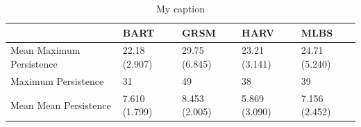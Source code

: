 \documentclass[10pt]{article}
\begin{document}
\begin{table}[]
\centering
\caption{My caption}
\label{Table 1: Summary statistics across all transects in a specific site with mean and standard deviation in parenthesis.}
\begin{tabular}{|l|l|l|l|l|}
\hline
                         & BART          & GRSM          & HARV          & MLBS          \\ \hline
Mean Maximum Persistence & 22.18 (2.907) & 29.75 (6.845) & 23.21 (3.141) & 24.71 (5.240) \\ \hline
Maximum Persistence      & 31            & 49            & 38            & 39            \\ \hline
Mean Mean Persistence    & 7.610 (1.799) & 8.453 (2.005) & 5.869 (3.090) & 7.156 (2.452) \\ \hline
\end{tabular}
\end{table}
\end{document}
